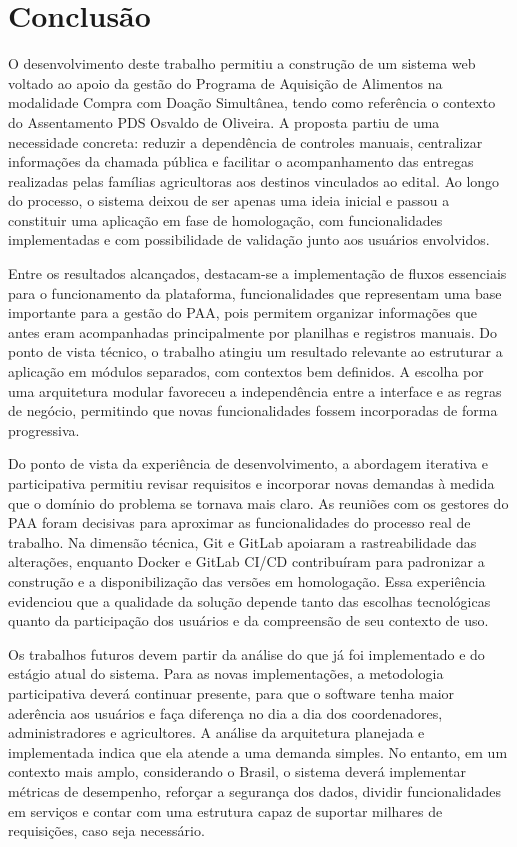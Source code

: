 \chapter{Conclusão}
\label{chap7}

O desenvolvimento deste trabalho permitiu a construção de um sistema web voltado ao apoio da gestão do Programa de Aquisição de Alimentos na modalidade Compra com Doação Simultânea, tendo como referência o contexto do Assentamento PDS Osvaldo de Oliveira. A proposta partiu de uma necessidade concreta: reduzir a dependência de controles manuais, centralizar informações da chamada pública e facilitar o acompanhamento das entregas realizadas pelas famílias agricultoras aos destinos vinculados ao edital. Ao longo do processo, o sistema deixou de ser apenas uma ideia inicial e passou a constituir uma aplicação em fase de homologação, com funcionalidades implementadas e com possibilidade de validação junto aos usuários envolvidos.

Entre os resultados alcançados, destacam-se a implementação de fluxos essenciais para o funcionamento da plataforma, funcionalidades que representam uma base importante para a gestão do PAA, pois permitem organizar informações que antes eram acompanhadas principalmente por planilhas e registros manuais. Do ponto de vista técnico, o trabalho atingiu um resultado relevante ao estruturar a aplicação em módulos separados, com contextos bem definidos. A escolha por uma arquitetura modular favoreceu a independência entre a interface e as regras de negócio, permitindo que novas funcionalidades fossem incorporadas de forma progressiva.

Do ponto de vista da experiência de desenvolvimento, a abordagem iterativa e participativa permitiu revisar requisitos e incorporar novas demandas à medida que o domínio do problema se tornava mais claro. As reuniões com os gestores do PAA foram decisivas para aproximar as funcionalidades do processo real de trabalho. Na dimensão técnica, Git e GitLab apoiaram a rastreabilidade das alterações, enquanto Docker e GitLab CI/CD contribuíram para padronizar a construção e a disponibilização das versões em homologação. Essa experiência evidenciou que a qualidade da solução depende tanto das escolhas tecnológicas quanto da participação dos usuários e da compreensão de seu contexto de uso.

Os trabalhos futuros devem partir da análise do que já foi implementado e do estágio atual do sistema. Para as novas implementações, a metodologia participativa deverá continuar presente, para que o software tenha maior aderência aos usuários e faça diferença no dia a dia dos coordenadores, administradores e agricultores. A análise da arquitetura planejada e implementada indica que ela atende a uma demanda simples. No entanto, em um contexto mais amplo, considerando o Brasil, o sistema deverá implementar métricas de desempenho, reforçar a segurança dos dados, dividir funcionalidades em serviços e contar com uma estrutura capaz de suportar milhares de requisições, caso seja necessário.

